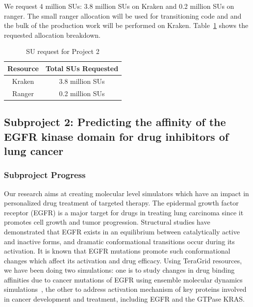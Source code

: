 \documentclass[a4paper,11pt]{article}
\newcommand{\up}{\vspace*{-1em}}
\begin{document}
We request 4 million SUs: 3.8 million SUs on Kraken and 0.2 million SUs on ranger. The small ranger allocation will be used for transitioning code and and the bulk of the production work will be performed on Kraken. Table~\ref{table:project21} shows the requested allocation breakdown.


\begin{table}[!h]
\begin{center}
\begin{tabular}{|c|c| }
\hline 
Resource & Total SUs Requested \\ 
\hline
Kraken   & 3.8 million SUs \\
\hline
Ranger   & 0.2 million SUs \\
\hline
\end{tabular}
\end{center}
  \caption{SU request for Project 2}\label{table:project21}
\up
\end{table}


\subsection{Subproject 2: Predicting the affinity of the EGFR kinase domain for drug inhibitors of lung cancer}

\subsubsection{Subproject Progress}
Our research aims at creating molecular level simulators which have an impact in personalized drug treatment of targeted therapy. The epidermal growth factor receptor (EGFR) is a major target for drugs in treating lung carcinoma since it promotes cell growth and tumor progression. Structural studies have demonstrated that EGFR exists in an equilibrium between catalytically active and inactive forms, and dramatic conformational transitions occur during its activation. It is known that EGFR mutations promote such conformational changes which affect its activation and drug efficacy. Using TeraGrid resources, we have been doing two simulations: one is to study changes in drug binding affinities due to cancer mutations of EGFR using ensemble molecular dynamics simulations~\cite{Ref6,Ref7,Ref8}, the other to address activation mechanism of key proteins involved in cancer development and treatment, including EGFR and the GTPase KRAS.
\end{document}
